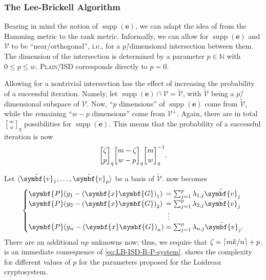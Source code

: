 \documentclass[version=last, paper=A4, parskip=half, oneside,%
toc=bibliography, toc=listof, listof=leveldown]{scrbook}
\theoremstyle{plain}
\theoremstyle{definition}
\theoremstyle{remark}
\renewcommand*{\vec}{\symbf}
\newcommand*{\mat}{\symbf}
\DeclareMathOperator{\supp}{supp}
\DeclarePairedDelimiter{\basis}{\langle}{\rangle}
\newcommand*{\NN}{\ensuremath{\mathbb{N}}}
\DeclarePairedDelimiter{\ceil}{\lceil}{\rceil}
\DeclareRobustCommand{\gbinom}{\genfrac[]{0pt}{}}
\newcommand*{\PISD}{\textsc{Plain}\=/ISD}
\begin{document}
\subsubsection{The Lee\--Brickell Algorithm}

Bearing in mind the notion of \(\supp(\vec{e})\), we can adapt the idea of
\textcite{LB88} from the Hamming metric to the rank metric.  Informally, we can
allow for \(\supp(\vec{e})\) and \(\mathcal{V}\) to be
\enquote{near\-/orthogonal}, i.e., for a \(p\)\=/dimensional intersection
between them.  The dimension of the intersection is determined by a parameter
\(p \in \NN\) with \(0 \le p \le w\).  \PISD{} corresponds directly to
\(p = 0\).

Allowing for a nontrivial intersection has the effect of increasing the
probability of a successful iteration.  Namely, let
\(\supp(\vec{e}) \cap \mathcal{V} = \tilde{\mathcal{V}}\), with
\(\tilde{\mathcal{V}}\) being a \(p\)\=/dimensional subspace of
\(\mathcal{V}\).  Now, \enquote{\(p\) dimensions} of \(\supp(\vec{e})\) come
from \(\tilde{\mathcal{V}}\), while the remaining \enquote{\(w - p\)
  dimensions} come from \(\mathcal{V}^{\perp}\).  Again, there are in total
\(\gbinom{m}{w}_q\) possibilities for \(\supp(\vec{e})\).  This means that the
probability of a successful iteration is now
\[
  \gbinom{\zeta}{p}_q \gbinom{m - \zeta}{w - p}_q \gbinom{m}{w}_q^{-1}\text.
\]

Let \(\basis{\tilde{\vec{v}}_1, \ldots, \tilde{\vec{v}}_p}\) be a basis of
\(\tilde{\mathcal{V}}\).   now becomes
\begin{equation}\label{eq:LB-ISD-R-P-system}
  \setlength{\arraycolsep}{0pt}
  \newcolumntype{B}{>{{}}c<{{}}}
  \left\{
    \begin{array}{l B l}
      \mat{P} (y_1 - {(\vec{x} \mat{G})}_1)
      & = &
            \sum_{j = 1}^p \lambda_{1, j} \tilde{\vec{v}}_j \\
      \mat{P} (y_2 - {(\vec{x} \mat{G})}_2)
      & = &
            \sum_{j = 1}^p \lambda_{2, j} \tilde{\vec{v}}_j \\
      & \vdots &                                          \\
      \mat{P} (y_n - {(\vec{x} \mat{G})}_n)
      & = &
            \sum_{j = 1}^p \lambda_{n, j} \tilde{\vec{v}}_j\text.
    \end{array}
  \right.
\end{equation}
There are an additional \(n p\) unknowns now; thus, we require that
\(\zeta = \ceil{m k / {n}} + p\).   is an immediate
consequence of \cref{eq:LB-ISD-R-P-system}.  
shows the complexity for different values of \(p\) for the parameters proposed
for the Loidreau cryptosystem.
\end{document}
